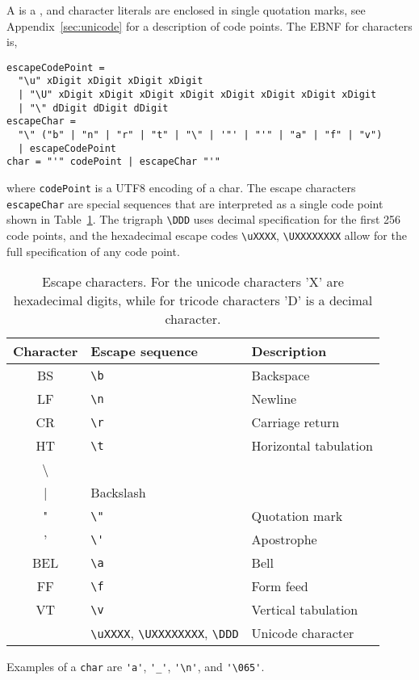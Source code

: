 A  is a  , and character literals are enclosed in single quotation marks, see Appendix~\ref{sec:unicode} for a description of code points. The EBNF for characters is,
%
\begin{lstlisting}[language=EBNF]
escapeCodePoint = 
  "\u" xDigit xDigit xDigit xDigit
  | "\U" xDigit xDigit xDigit xDigit xDigit xDigit xDigit xDigit
  | "\" dDigit dDigit dDigit 
escapeChar = 
  "\" ("b" | "n" | "r" | "t" | "\" | '"' | "'" | "a" | "f" | "v")
  | escapeCodePoint
char = "'" codePoint | escapeChar "'"
\end{lstlisting}
% 
where \lstinline[language=EBNF]!codePoint! is a UTF8 encoding of a char. The escape characters \lstinline[language=EBNF]{escapeChar} are special sequences that are interpreted as a single code point shown in Table~\ref{tab:escapeChar}. The trigraph \lstinline|\DDD| uses decimal specification for the first 256 code points, and the hexadecimal escape codes \lstinline|\uXXXX|, \lstinline|\UXXXXXXXX| allow for the full specification of any code point.
\begin{table}
  \centering
  \begin{tabular}{|c|l|l|}
    \hline
    Character& Escape sequence & Description\\
    \hline
    BS &\lstinline|\b|& Backspace\\
    LF &\lstinline|\n|&Newline\\
    CR &\lstinline|\r|&Carriage return\\
    HT &\lstinline|\t|&Horizontal tabulation\\
    \textbackslash &\lstinline|\\|&Backslash\\
     " &\lstinline|\"|&Quotation mark\\
    ' &\lstinline|\'|&Apostrophe\\
    BEL&\lstinline|\a|& Bell\\
    FF&\lstinline|\f|&Form feed\\
    VT &\lstinline|\v|&Vertical tabulation\\
    &\lstinline|\uXXXX|, \lstinline|\UXXXXXXXX|, \lstinline|\DDD|&Unicode character\\
    \hline
  \end{tabular}
  \caption{Escape characters. For the unicode characters 'X' are hexadecimal digits, while for tricode characters 'D' is a decimal character.}
  \label{tab:escapeChar}
\end{table}
Examples of a \lstinline[language=ebnf]!char! are \lstinline{'a'}, \lstinline{'_'}, \lstinline{'\n'}, and \lstinline{'\065'}.

